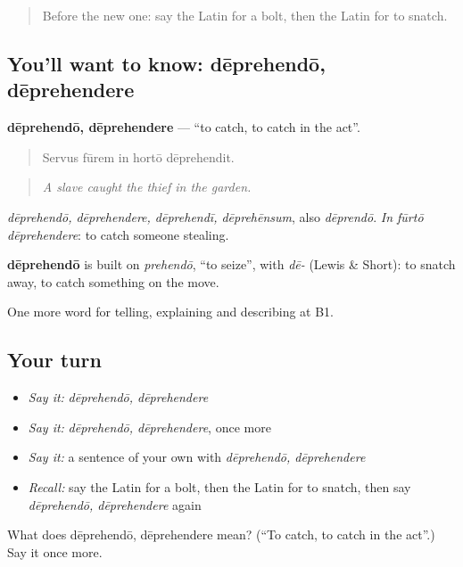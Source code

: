 \begin{quote}
Before the new one: say the Latin for a bolt, then the Latin for to snatch.
\end{quote}

\subsection*{You'll want to know: dēprehendō, dēprehendere}
\textbf{dēprehendō, dēprehendere} — \textquotedblleft{}to catch, to catch in the act\textquotedblright{}.

\begin{quote}
Servus fūrem in hortō dēprehendit.
\end{quote}

\begin{quote}
\emph{A slave caught the thief in the garden.}
\end{quote}

\emph{dēprehendō, dēprehendere, dēprehendī, dēprehēnsum}, also \emph{dēprendō}. \emph{In fūrtō dēprehendere}: to catch someone stealing.

\begin{cousinweb}
\textbf{dēprehendō} is built on \emph{prehendō}, \textquotedblleft{}to seize\textquotedblright{}, with \emph{dē-} (Lewis \& Short): to snatch away, to catch something on the move.
\end{cousinweb}

\begin{grammarlens}[title={What you've built}]
One more word for telling, explaining and describing at B1.
\end{grammarlens}

\subsection*{Your turn}
\begin{itemize}
\raggedright
  \item \emph{Say it:} \emph{dēprehendō, dēprehendere}
  \item \emph{Say it:} \emph{dēprehendō, dēprehendere}, once more
  \item \emph{Say it:} a sentence of your own with \emph{dēprehendō, dēprehendere}
  \item \emph{Recall:} say the Latin for a bolt, then the Latin for to snatch, then say \emph{dēprehendō, dēprehendere} again
\end{itemize}

\begin{tcolorbox}[breakable,colback=teal!4,colframe=teal!35!black,title={Before you move on}]
What does dēprehendō, dēprehendere mean? (\textquotedblleft{}To catch, to catch in the act\textquotedblright{}.) Say it once more.
\end{tcolorbox}
